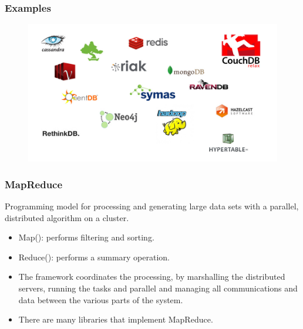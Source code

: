 \documentclass[hyperref={pdfpagelabels=true}]{beamer}
\begin{document}
\begin{frame}
\frametitle{Examples}
    \begin{figure}   
      \includegraphics[width=\textwidth]{examples.jpg}%
    \end{figure}    
\end{frame}

\begin{frame}
\frametitle{MapReduce}
Programming model for processing and generating large data sets with a parallel, distributed algorithm on a cluster.
    \begin{itemize}    
      \item<1->Map(): performs filtering and sorting.%
      \item<1->Reduce(): performs a summary operation. %
      \item<2->The framework coordinates the processing, by marshalling the distributed servers, running the tasks and parallel and managing all communications and data between the various parts of the system.%
      \item<3->There are many libraries that implement MapReduce.%
      \end{itemize}
\end{frame}
\end{document}
